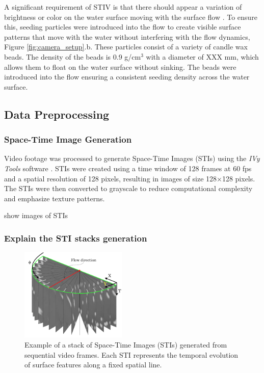 \documentclass[12pt]{elsarticle}
\begin{document}
A significant requirement of STIV is that there should appear a variation of brightness or color on the water surface moving with the surface flow \cite{fujita2007development}. To ensure this, seeding particles were introduced into the flow to create visible surface patterns that move with the water without interfering with the flow dynamics, Figure \ref{fig:camera_setup}.b. These particles consist of a variety of candle wax beads. The density of the beads is 0.9 g/cm$^3$ with a diameter of XXX mm, which allows them to float on the water surface without sinking. The beads were introduced into the flow ensuring a consistent seeding density across the water surface.
\subsection{Data Preprocessing}
\subsubsection{Space-Time Image Generation}
Video footage was processed to generate Space-Time Images (STIs) using the \textit{IVy Tools} software \cite{engel2025ivytools}. STIs were created using a time window of 128 frames at 60 fps and a spatial resolution of 128 pixels, resulting in images of size 128×128 pixels. The STIs were then converted to grayscale to reduce computational complexity and emphasize texture patterns.

show images of STIs

\subsubsection{Explain the STI stacks generation}

\begin{figure}[!htbp]
    \centering
    \includegraphics[width=0.45\textwidth]{plots/STI_stack.drawio.png}
    \caption{Example of a stack of Space-Time Images (STIs) generated from sequential video frames. Each STI represents the temporal evolution of surface features along a fixed spatial line.}
    \label{fig:sti_stack}
\end{figure}
\end{document}
